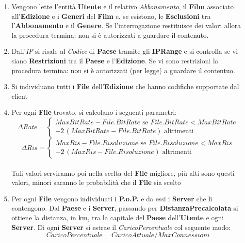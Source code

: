 \documentclass{article}
\begin{document}
\begin{enumerate}
    \item Vengono lette l'entità \textbf{Utente} e il relativo \textit{Abbonamento}, il \textbf{Film} associato all'\textbf{Edizione} e i \textbf{Generi} del \textbf{Film} e, se esistono, le \textbf{Esclusioni} tra l'\textbf{Abbonamento} e il \textbf{Genere}. Se l'interrogazione restituisce dei valori allora la procedura termina: non si è autorizzati a guardare il contenuto. \\
    \item Dall'\textit{IP} si risale al \textit{Codice} di \textbf{Paese} tramite gli \textbf{IPRange} e si controlla se vi siano \textbf{Restrizioni} tra il \textbf{Paese} e l'\textbf{Edizione}. Se vi sono restrizioni la procedura termina: non si è autorizzati (per legge) a guardare il contentuo. \\
    \item Si individuano tutti i \textbf{File} dell'\textbf{Edizione} che hanno codifiche supportate dal client
    \item Per ogni \textbf{File} trovato, si calcolano i seguenti parametri: \\  
    \[
    \Delta Rate = \begin{cases} 
        MaxBitRate - File.BitRate\text{ se }File.BitRate < MaxBitRate \\
        - 2\,(MaxBitRate - File.BitRate)\text{ altrimenti}
    \end{cases} 
    \]
    \[
    \Delta Ris = \begin{cases} 
        MaxRis - File.Risoluzione\text{ se }File.Risoluzione < MaxRis \\
        - 2\,(MaxRis - File.Risoluzione)\text{ altrimenti}
    \end{cases} 
    \] \\
    Tali valori serviranno poi nella scelta del \textbf{File} migliore, più alti sono questi valori, minori saranno le probabilità che il \textbf{File} sia scelto \\
    \item Per ogni \textbf{File} vengono individuati i \textbf{P.o.P.} e da essi i \textbf{Server} che li contengono. Dal \textbf{Paese} e i \textbf{Server}, passando per \textbf{DistanzaPrecalcolata} si ottiene la distanza, in km, tra la capitale del \textbf{Paese} dell'\textbf{Utente} e ogni \textbf{Server}. Di ogni \textbf{Server} si estrae il \textit{CaricoPercentuale} col seguente modo: \\
    \[
    CaricoPercentuale = CaricoAttuale/MaxConnessioni
\]
\end{enumerate}
\end{document}
